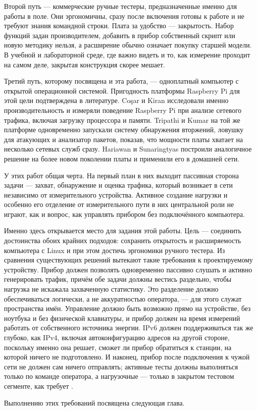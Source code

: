 Второй путь — коммерческие ручные тестеры, предназначенные именно для работы в поле. Они эргономичны, сразу после включения готовы к работе и не требуют знания командной строки. Плата за удобство — закрытость. Набор функций задан производителем, добавить в прибор собственный скрипт или новую методику нельзя, а расширение обычно означает покупку старшей модели. В учебной и лабораторной среде, где важно видеть и то, как измерение проходит на самом деле, закрытая конструкция скорее мешает.

Третий путь, которому посвящена и эта работа, — одноплатный компьютер с открытой операционной системой. Пригодность платформы Raspberry Pi для этой цели подтверждена в литературе. Coşar и Kiran \cite{cosar2018} исследовали именно производительность и измеряли поведение Raspberry Pi при анализе сетевого трафика, включая загрузку процессора и памяти. Tripathi и Kumar \cite{tripathi2018} на той же платформе одновременно запускали систему обнаружения вторжений, ловушку для атакующих и анализатор пакетов, показав, что мощности платы хватает на несколько сетевых служб сразу. Hariawan и Sunaringtyas \cite{hariawan2021} построили аналогичное решение на более новом поколении платы и применили его в домашней сети.

У этих работ общая черта. На первый план в них выходит пассивная сторона задачи — захват, обнаружение и оценка трафика, который возникает в сети независимо от измерительного устройства. Активное создание нагрузки и особенно его отделение от измерительного пути в них центральной роли не играют, как и вопрос, как управлять прибором без подключённого компьютера.

Именно здесь открывается место для задания этой работы. Цель — соединить достоинства обоих крайних подходов: сохранить открытость и расширяемость компьютера с Linux и при этом достичь эргономики ручного тестера. Из сравнения существующих решений вытекают такие требования к проектируемому устройству. Прибор должен позволять одновременно пассивно слушать и активно генерировать трафик, причём обе задачи должны вестись раздельно, чтобы нагрузка не искажала захваченную статистику. Это разделение должно обеспечиваться логически, а не аккуратностью оператора, — для этого служат пространства имён. Управление должно быть возможно прямо на устройстве, без ноутбука и без физической клавиатуры, и прибор должен на время измерений работать от собственного источника энергии. IPv6 должен поддерживаться так же глубоко, как IPv4, включая автоконфигурацию адресов на другой стороне, поскольку именно она решает, сможет ли прибор обратиться к станции, на которой ничего не подготовлено. И наконец, прибор после подключения к чужой сети не должен сам ничего отправлять; активные тесты должны выполняться только по команде оператора, а нагрузочные — только в закрытом тестовом сегменте, как требует \cite{rfc6815}.

Выполнению этих требований посвящена следующая глава.
